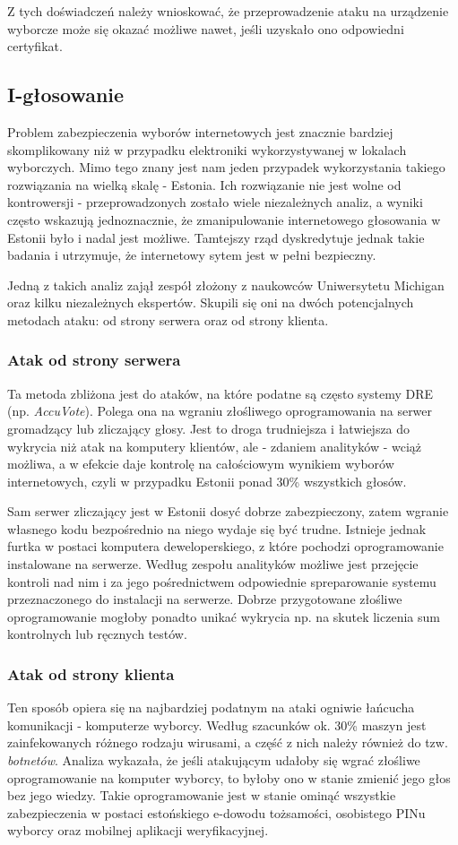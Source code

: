 \documentclass[polish]{kbk}
\begin{document}
Z tych doświadczeń należy wnioskować, że przeprowadzenie ataku na urządzenie wyborcze może się okazać możliwe nawet, jeśli uzyskało ono odpowiedni certyfikat.

\subsection{I-głosowanie \cite{estonia}} 
Problem zabezpieczenia wyborów internetowych jest znacznie bardziej skomplikowany niż w przypadku elektroniki wykorzystywanej w lokalach wyborczych. Mimo tego znany jest nam jeden przypadek wykorzystania takiego rozwiązania na wielką skalę - Estonia. Ich rozwiązanie nie jest wolne od kontrowersji - przeprowadzonych zostało wiele niezależnych analiz, a wyniki często wskazują jednoznacznie, że zmanipulowanie internetowego głosowania w Estonii było i nadal jest możliwe. Tamtejszy rząd dyskredytuje jednak takie badania i utrzymuje, że internetowy sytem jest w pełni bezpieczny. 

Jedną z takich analiz zajął zespół złożony z naukowców Uniwersytetu Michigan oraz kilku niezależnych ekspertów. Skupili się oni na dwóch potencjalnych metodach ataku: od strony serwera oraz od strony klienta.

\subsubsection{Atak od strony serwera} \label{estonia-server}
Ta metoda zbliżona jest do ataków, na które podatne są często systemy DRE (np. \textit{AccuVote}). Polega ona na wgraniu złośliwego oprogramowania na serwer gromadzący lub zliczający głosy. Jest to droga trudniejsza i łatwiejsza do wykrycia niż atak na komputery klientów, ale - zdaniem analityków - wciąż możliwa, a w efekcie daje kontrolę na całościowym wynikiem wyborów internetowych, czyli w przypadku Estonii ponad 30\% wszystkich głosów.

Sam serwer zliczający jest w Estonii dosyć dobrze zabezpieczony, zatem wgranie własnego kodu bezpośrednio na niego wydaje się być trudne. Istnieje jednak furtka w postaci komputera deweloperskiego, z które pochodzi oprogramowanie instalowane na serwerze. Według zespołu analityków możliwe jest przejęcie kontroli nad nim i za jego pośrednictwem odpowiednie spreparowanie systemu przeznaczonego do instalacji na serwerze. Dobrze przygotowane złośliwe oprogramowanie mogłoby ponadto unikać wykrycia np. na skutek liczenia sum kontrolnych lub ręcznych testów.

\subsubsection{Atak od strony klienta}
Ten sposób opiera się na najbardziej podatnym na ataki ogniwie łańcucha komunikacji - komputerze wyborcy. Według szacunków ok. 30\% maszyn jest zainfekowanych różnego rodzaju wirusami, a część z nich należy również do tzw. \textit{botnetów}. Analiza wykazała, że jeśli atakującym udałoby się wgrać złośliwe oprogramowanie na komputer wyborcy, to byłoby ono w stanie zmienić jego głos bez jego wiedzy. Takie oprogramowanie jest w stanie ominąć wszystkie zabezpieczenia w postaci estońskiego e-dowodu tożsamości, osobistego PINu wyborcy oraz mobilnej aplikacji weryfikacyjnej.
\end{document}
